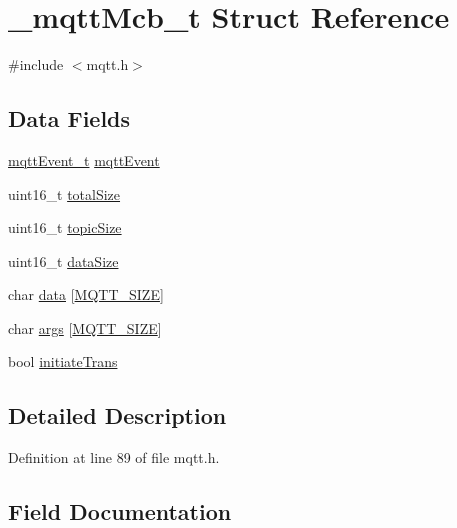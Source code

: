\hypertarget{struct__mqttMcb__t}{}\section{\+\_\+mqtt\+Mcb\+\_\+t Struct Reference}
\label{struct__mqttMcb__t}


{\ttfamily \#include $<$mqtt.\+h$>$}

\subsection*{Data Fields}
\begin{DoxyCompactItemize}
\item 
\hyperlink{mqtt_8h_addc2504b9e66d98288c510964264c855}{mqtt\+Event\+\_\+t} \hyperlink{struct__mqttMcb__t_a2444e1da64e107ac3e38c67ca5c5bbed}{mqtt\+Event}
\item 
uint16\+\_\+t \hyperlink{struct__mqttMcb__t_a200ee8c05ebb39e64b7b66b7710dce0f}{total\+Size}
\item 
uint16\+\_\+t \hyperlink{struct__mqttMcb__t_adb2a22865e9366348daa11bad69f3a1e}{topic\+Size}
\item 
uint16\+\_\+t \hyperlink{struct__mqttMcb__t_ae44a8d1ad53b2786df67ab57179d50ae}{data\+Size}
\item 
char \hyperlink{struct__mqttMcb__t_a007841c0e069c54cc67965906022496a}{data} \mbox{[}\hyperlink{mqtt_8h_ab4dd3a15b57435a3cd9a97736f4366a8}{M\+Q\+T\+T\+\_\+\+S\+I\+ZE}\mbox{]}
\item 
char \hyperlink{struct__mqttMcb__t_a26e0c1005309c7095d87a990914646c6}{args} \mbox{[}\hyperlink{mqtt_8h_ab4dd3a15b57435a3cd9a97736f4366a8}{M\+Q\+T\+T\+\_\+\+S\+I\+ZE}\mbox{]}
\item 
bool \hyperlink{struct__mqttMcb__t_aacc31f6cb888369dc2294e11898c3114}{initiate\+Trans}
\end{DoxyCompactItemize}


\subsection{Detailed Description}


Definition at line 89 of file mqtt.\+h.



\subsection{Field Documentation}
\mbox{\label{struct__mqttMcb__t_a26e0c1005309c7095d87a990914646c6}} 
